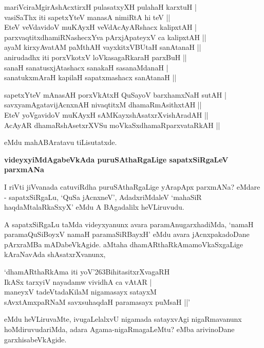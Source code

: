 \begin{shloka}
mariVciraMgirAshAcxtirxH pulasatxyXH pulahaH karxtuH |\\\label{88}
vasiSaThx iti sapetxYteV manasA nimiRtA hi teV ||\\

EteV veVdavidoV muKAyxH veVdAcAyARshacx kalipxtAH |\\
parxvaqtitxdhamiRNashecxYva pArxjApateyxV ca kalipxtAH ||\\

ayaM kirxyAvatAM paMthAH vayxkitxVBUtaH sanAtanaH ||\\
anirudadhx iti porxVkotxV loVkasagaRkaraH parxBuH ||\\

sanaH sanatusxjAtashacx sanakaH sasanaMdanaH |\\
sanatukxmAraH kapilaH sapatxmashacx sanAtanaH ||

sapetxYteV mAnasAH porxVkAtxH QuSayoV barxhamxNaH sutAH |\\
savxyamAgatavijAcnxnAH nivaqtitxM dhamaRmAsithxtAH ||\\

EteV yoVgavidoV muKAyxH sAMKayxshAsatxrXvishAradAH ||\\
AcAyAR dhamaRshAsetxrXVSu moVkaSxdhamaRparxvataRkAH ||
\end{shloka}

eMdu mahABAratavu tiLisutatxde.

\noindent
\textbf{videyxyiMdAgabeVkAda puruSAthaRgaLige sapatxSiRgaLeV parxmANa}\label{page89}

I riVti jiVvanada catuviRdha puruSAthaRgaLige yArapApx parxmANa? eMdare - sapatxSiRgaLu, `QuSa jAcnxneV', AdadxriMdaleV `mahaSiR haqdaMtalaRkaSxyX' eMdu A BAgadalilx heVLiruvudu.

A sapatxSiRgaLu taMda videyxyanunx avara paramAnugarxhadiMda, `namaH paramaQuSiBoyxV namaH paramaSiRBayxH' eMdu avara jAcnxpakadoDane pArxraMBa mADabeVkAgide. aMtaha dhamARthaRkAmamoVkaSxgaLige kAraNavAda shAsatxrXvanunx,

\begin{shloka}
`dhamARthaRkAma iti yoV\char'263BihitasitxrXvagaRH\\
IkASx tarxyiV nayadamw vividhA ca vAtAR |\\
maneyxV tadeVtadaKilaM nigamasayx satayxM\\
sAvxtAmxpaRNaM savxsuhaqdaH paramasayx puMsaH ||'
\end{shloka}

eMdu heVLiruvaMte, ivugaLelalxvU nigamada satayxvAgi nigaRmavanunx hoMdiruvudariMda, adara Agama-nigaRmagaLeMtu? eMba arivinoDane garxhisabeVkAgide.

